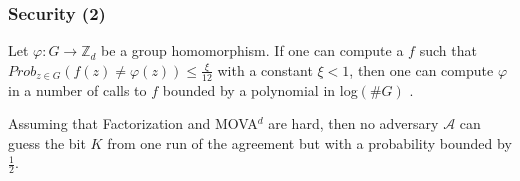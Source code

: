 \documentclass{beamer}
\begin{document}
\begin{frame}
\frametitle{Security (2)}

\begin{theorem}
				Let $\varphi: G  \rightarrow \mathbb{Z}_d$ be a group homomorphism. If one can compute a $f$ such that 
				$Prob_{z \in G}(f(z) \not= \varphi(z)) \leq \frac{\xi}{12}$  with a constant $\xi < 1$, then one can compute
				$\varphi$ in a number of calls to $f$ bounded by a polynomial in log$(\# G)$ \cite{mova} . 
\end{theorem}

\bigskip

\begin{corollary}
	Assuming that Factorization and MOVA$^d$ are hard, then no adversary $\mathcal{A}$ can guess the bit $K$ from one run of the agreement but with a probability bounded by 
	$\frac{1}{2}$. 	
\end{corollary}
 	
\end{frame}



\end{document}
